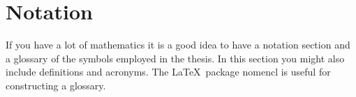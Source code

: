 \chapter*{Notation}

If you have a lot of mathematics it is a good idea to have a notation
section and a glossary of the symbols employed in the thesis.  In this
section you might also include definitions and acronyms.  The
\LaTeX\ package nomencl is useful for constructing a glossary.
